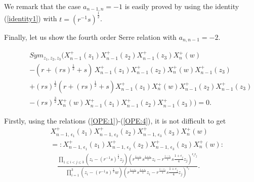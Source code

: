 \documentclass{amsproc}
\theoremstyle{remark}
\numberwithin{equation}{section}
\begin{document}
We remark that the case $a_{n-1, n}=-1$ is easily proved by using
the identity (\ref{identity1}) with $t=(r^{-1}s)^{\frac{1}{2}}$.

Finally, let us show the fourth order Serre relation with $a_{n,
n-1}=-2$.

\begin{eqnarray}
&&Sym_{z_1,
z_2,z_3}\Big(X_{n-1}^{+}(z_1)
X_{n-1}^{+}(z_2)X_{n-1}^{+}(z_3)X_n^{+}(w)
\nonumber\\
&\quad&-
(r{+}(rs)^{\frac{1}{2}}+s)\,X_{n-1}^{+}(z_1)X_{n-1}^{+}(z_2)X_n^{+}(w)X_{n-1}^{+}(z_3)\\
&\quad&+(rs)^{\frac{1}{2}}(r{+}(rs)^{\frac{1}{2}}+s)
X_{n-1}^{+}(z_1)X_n^{+}(w)X_{n-1}^{+}(z_2)X_{n-1}^{+}(z_3)\nonumber\\
&\quad&-(rs)^{\frac{3}{2}}X_n^{+}(w)X_{n-1}^{+}(z_1)X_{n-1}^{+}(z_2)X_{n-1}^{+}(z_3)\Big)=0.\nonumber
\end{eqnarray}

Firstly, using the relations (\ref{OPE:1})-(\ref{OPE:4}), it is not difficult to get
\begin{eqnarray*}
&&X_{n-1,\,{\epsilon}_1}^+(z_1)X_{n-1,\,{\epsilon}_2}^+(z_2)X_{n-1,\,{\epsilon}_3}^+(z_3)X^+_{n}(w)\\
&&=:X_{n-1,\,{\epsilon}_1}^+(z_1)X_{n-1,\,{\epsilon}_2}^+(z_2)X_{n-1,\,{\epsilon}_3}^+(z_3)X^+_{n}(w):\\
&&\quad \frac{\prod_{1\leqslant i<j\leqslant 3}(z_i-(r^{-1}s)^{\frac{1}{2}}z_j)
(r^{\frac{1-{\epsilon}_i}{4}}s^{\frac{1+{\epsilon}_i}{4}}z_i-r^{\frac{1-{\epsilon}_j}{4}}s{\frac{1+{\epsilon}_j}{4}}z_j)^{{\epsilon}_i{\epsilon}_j}}
{\prod_{i=1}^{3}(z_i-(r^{-1}s)^{\frac{1}{2}}w)
(r^{\frac{1-{\epsilon}_i}{4}}s^{\frac{1+{\epsilon}_i}{4}}z_i-r^{\frac{1-{\epsilon}_j}{4}}s{\frac{1+{\epsilon}_j}{4}}z_j)^{{\epsilon}_i}}.
\end{eqnarray*}
\end{document}

